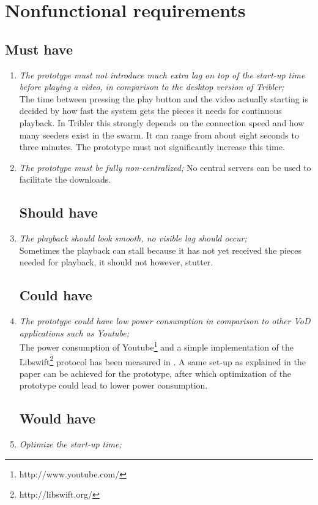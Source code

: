 \section{Nonfunctional requirements}
\thispagestyle{fancy}
\subsection{Must have}
\begin{enumerate}
\item \emph{The prototype must not introduce much extra lag on top of the start-up time before playing a video, in comparison to the desktop version of Tribler;}\\
The time between pressing the play button and the video actually starting is decided by how fast the system gets the pieces it needs for continuous playback. In Tribler this strongly depends on the connection speed and how many seeders exist in the swarm. It can range from about eight seconds to three minutes. The prototype must not significantly increase this time.

\item \emph{The prototype must be fully non-centralized;}
No central servers can be used to facilitate the downloads.

\subsection{Should have}
\item \emph{The playback should look smooth, no visible lag should occur;}\\
Sometimes the playback can stall because it has not yet received the pieces needed for playback, it should not however, stutter.

\subsection{Could have}
\item \emph{The prototype could have low power consumption in comparison to other VoD applications such as Youtube;}\\
The power consumption of Youtube\footnote{http://www.youtube.com/} and a simple implementation of the Libswift\footnote{http://libswift.org/} protocol has been measured in \cite{libswift12}. A same set-up as explained in the paper can be achieved for the prototype, after which optimization of the prototype could lead to lower power consumption.

\subsection{Would have}
\item \emph{Optimize the start-up time;}

\end{enumerate}
